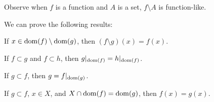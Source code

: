 \documentclass{article}
\begin{document}
Observe when $f$ is a function and $A$ is a set, $f\setminus A$ is function-like.

We can prove the following results:
\begin{thm}
\item\label{grfunc1:32} If $x\in\operatorname{dom}(f)\setminus\operatorname{dom}(g)$, then
  $(f\setminus g)(x)=f(x)$.
\item\label{grfunc1:33} If $f\subset g$ and $f\subset h$,
  then $g|_{\operatorname{dom}(f)}=h|_{\operatorname{dom}(f)}$.
\item\label{grfunc1:34} If $g\subset f$, then $g=f|_{\operatorname{dom}(g)}$.
\item\label{grfunc1:35} If $g\subset f$, $x\in X$, and $X\cap\operatorname{dom}(f)=\operatorname{dom}(g)$,
  then $f(x)=g(x)$.
\end{thm}
\end{document}
